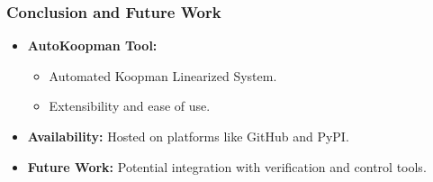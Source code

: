 \documentclass[shortpres,aspectratio=43]{beamer}
\begin{document}
\begin{frame}
\frametitle{Conclusion and Future Work}
\begin{itemize}
    \item<1-> \textbf{AutoKoopman Tool:} 
    \begin{itemize}
        \item Automated Koopman Linearized System.
        \item Extensibility and ease of use.
    \end{itemize}
    \item<2-> \textbf{Availability:} Hosted on platforms like GitHub and PyPI.
    \item<3-> \textbf{Future Work:} Potential integration with verification and control tools.
\end{itemize}
\end{frame}
\end{document}
